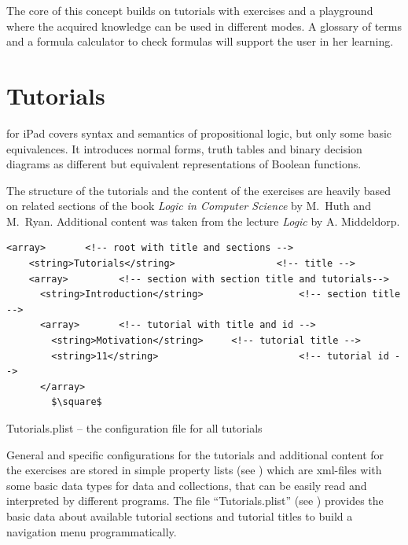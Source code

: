 

The core of this concept builds on tutorials with exercises 
and a playground where the %
acquired knowledge can be used in different modes. 
A glossary of terms and a formula calculator to check formulas will support the user in her learning.

\section{Tutorials}

\Nyaya for iPad covers syntax and semantics of propositional logic, 
but only some basic equivalences.
It introduces normal forms, truth tables and binary decision diagrams 
as different but equivalent representations of Boolean functions.

The structure of the tutorials and the content of the exercises are heavily based on %
related sections of the book  
{\em Logic in Computer Science}  by M.~Huth and M.~Ryan. \cite{Huth:2004:LCS:975331}
Additional content was taken from the lecture {\em Logic}  by {A. Middeldorp}. \cite{Middeldorp:2012:LICS}


\begin{table}[htdp]
\begin{center}
\begin{lstlisting}[mathescape,firstnumber=5]
  <array> 		<!-- root with title and sections -->
    <string>Tutorials</string> 					<!-- title -->
    <array>			<!-- section with section title and tutorials-->
      <string>Introduction</string> 				<!-- section title -->
      <array>		<!-- tutorial with title and id -->
        <string>Motivation</string> 	<!-- tutorial title -->
        <string>11</string> 						<!-- tutorial id -->
      </array>
		$\square$
\end{lstlisting}
\caption{Tutorials.plist – the configuration file for all tutorials}
\label{tab:TUTORIALPLIST}
\end{center}
\end{table}%

General and specific configurations for the tutorials and additional content for the exercises 
are stored in simple property lists (see ) %
which are xml-files with some basic data types for data and collections, 
that can be easily read and interpreted by different programs.
The file “Tutorials.plist” (see ) 
provides the basic data about available tutorial sections and tutorial titles 
to build a navigation menu programmatically.

